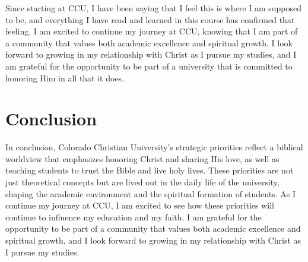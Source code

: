 \documentclass[stu,12pt,floatsintext]{apa7}
\begin{document}
Since starting at CCU, I have been saying that I feel this is where I am supposed to be, and everything I have read and learned in this course has confirmed that feeling. I am excited to continue my journey at CCU, knowing that I am part of a community that values both academic excellence and spiritual growth. I look forward to growing in my relationship with Christ as I pursue my studies, and I am grateful for the opportunity to be part of a university that is committed to honoring Him in all that it does.
\section{Conclusion}
In conclusion, Colorado Christian University's strategic priorities reflect a biblical worldview that emphasizes honoring Christ and sharing His love, as well as teaching students to trust the Bible and live holy lives. These priorities are not just theoretical concepts but are lived out in the daily life of the university, shaping the academic environment and the spiritual formation of students. As I continue my journey at CCU, I am excited to see how these priorities will continue to influence my education and my faith. I am grateful for the opportunity to be part of a community that values both academic excellence and spiritual growth, and I look forward to growing in my relationship with Christ as I pursue my studies.
\printbibliography
\end{document}

